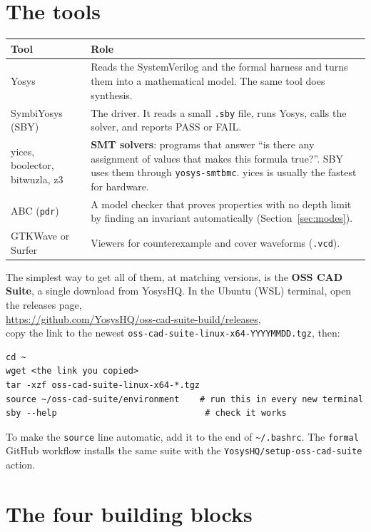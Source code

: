 \documentclass[11pt,a4paper]{article}
\newcommand{\file}[1]{\texttt{#1}}
\newcommand{\cmd}[1]{\texttt{#1}}
\begin{document}
\section{The tools}\label{sec:osscad}

\begin{center}
\begin{tabularx}{\linewidth}{@{}lL@{}}
\toprule
Tool & Role \\
\midrule
Yosys & Reads the SystemVerilog and the formal harness and turns them into a mathematical model. The same tool does synthesis. \\
SymbiYosys (SBY) & The driver. It reads a small \file{.sby} file, runs Yosys, calls the solver, and reports PASS or FAIL. \\
yices, boolector, bitwuzla, z3 & \textbf{SMT solvers}: programs that answer ``is there any assignment of values that makes this formula true?''. SBY uses them through \file{yosys-smtbmc}. yices is usually the fastest for hardware. \\
ABC (\texttt{pdr}) & A model checker that proves properties with no depth limit by finding an invariant automatically (Section~\ref{sec:modes}). \\
GTKWave or Surfer & Viewers for counterexample and cover waveforms (\file{.vcd}). \\
\bottomrule
\end{tabularx}
\end{center}

The simplest way to get all of them, at matching versions, is the \textbf{OSS CAD Suite}, a single download from YosysHQ. In the Ubuntu (WSL) terminal, open the releases page,\\ \url{https://github.com/YosysHQ/oss-cad-suite-build/releases},\\ copy the link to the newest \file{oss-cad-suite-linux-x64-YYYYMMDD.tgz}, then:
\begin{lstlisting}
cd ~
wget <the link you copied>
tar -xzf oss-cad-suite-linux-x64-*.tgz
source ~/oss-cad-suite/environment    # run this in every new terminal
sby --help                             # check it works
\end{lstlisting}

To make the \texttt{source} line automatic, add it to the end of \file{\textasciitilde/.bashrc}. The \cmd{formal} GitHub workflow installs the same suite with the \texttt{YosysHQ/setup-oss-cad-suite} action.

\section{The four building blocks}
\end{document}

